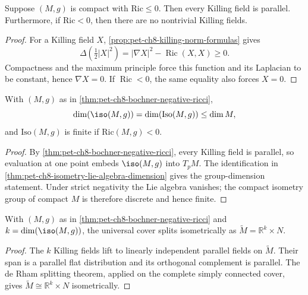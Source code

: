 \begin{theorem}
  \label{thm:pet-ch8-bochner-negative-ricci}
  Suppose $(M,g)$ is compact with $\mathrm{Ric}\le0$. Then every Killing field
  is parallel. Furthermore, if $\mathrm{Ric}<0$, then there are no nontrivial
  Killing fields.
\end{theorem}
\begin{proof}
  \sketch
  For a Killing field \(X\), \cref{prop:pet-ch8-killing-norm-formulas} gives
  \[
    \Delta\!\left(\tfrac12|X|^2\right)
    =|\nabla X|^2-\operatorname{Ric}(X,X)\ge0.
  \]
  Compactness and the maximum principle force this function and its Laplacian
  to be constant, hence \(\nabla X=0\). If \(\operatorname{Ric}<0\), the same
  equality also forces \(X=0\).
\end{proof}

\begin{corollary}
  \label{cor:pet-ch8-isometry-dimension-bound-negative-ricci}
  With $(M,g)$ as in \cref{thm:pet-ch8-bochner-negative-ricci},
  \[
    \dim(\iso(M,g))=\dim(\mathrm{Iso}(M,g))\le\dim M,
  \]
  and $\mathrm{Iso}(M,g)$ is finite if $\mathrm{Ric}(M,g)<0$.
\end{corollary}
\begin{proof}
  \sketch
  By \cref{thm:pet-ch8-bochner-negative-ricci}, every Killing field is
  parallel, so evaluation at one point embeds \(\iso(M,g)\) into \(T_pM\).
  The identification in
  \cref{thm:pet-ch8-isometry-lie-algebra-dimension} gives the group-dimension
  statement. Under strict negativity the Lie algebra vanishes; the compact
  isometry group of compact \(M\) is therefore discrete and hence finite.
\end{proof}

\begin{corollary}
  \label{cor:pet-ch8-splitting-negative-ricci}
  With $(M,g)$ as in \cref{thm:pet-ch8-bochner-negative-ricci} and
  $k=\dim(\iso(M,g))$, the universal cover splits isometrically as
  $\widetilde M=\mathbb{R}^k\times N$.
\end{corollary}
\begin{proof}
  \sketch
  The \(k\) Killing fields lift to linearly independent parallel fields on
  \(\widetilde M\). Their span is a parallel flat distribution and its
  orthogonal complement is parallel. The de Rham splitting theorem, applied
  on the complete simply connected cover, gives
  \(\widetilde M\cong\mathbb{R}^k\times N\) isometrically.
\end{proof}

